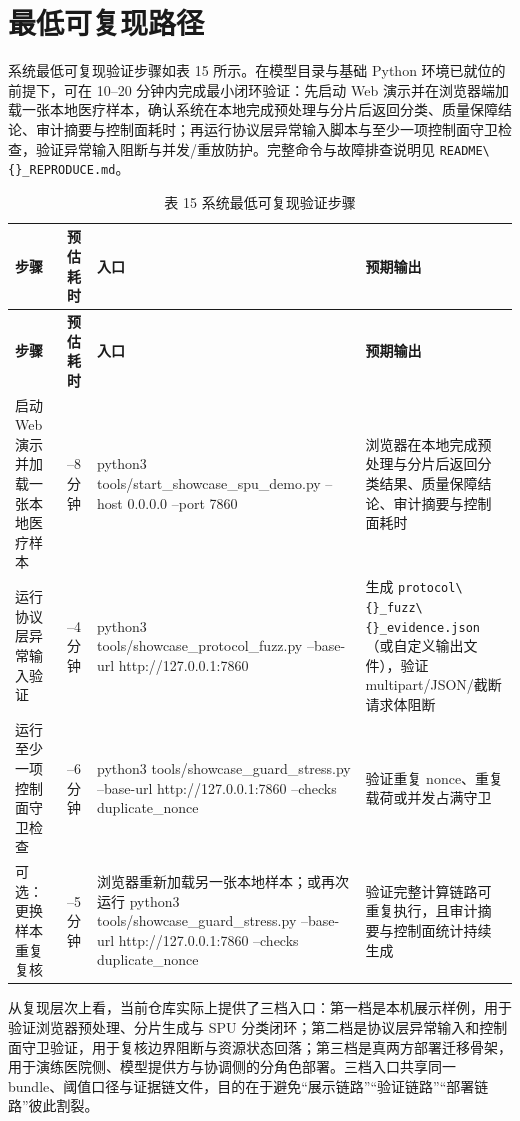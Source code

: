 \section{最低可复现路径}

系统最低可复现验证步骤如表 15 所示。在模型目录与基础 Python 环境已就位的前提下，可在 10–20 分钟内完成最小闭环验证：先启动 Web 演示并在浏览器端加载一张本地医疗样本，确认系统在本地完成预处理与分片后返回分类、质量保障结论、审计摘要与控制面耗时；再运行协议层异常输入脚本与至少一项控制面守卫检查，验证异常输入阻断与并发/重放防护。完整命令与故障排查说明见 \texttt{README\textbackslash\{\}\_REPRODUCE.md}。

\begin{longtable}{>{\raggedright\arraybackslash}p{}>{\raggedright\arraybackslash}p{}>{\raggedright\arraybackslash}p{}>{\raggedright\arraybackslash}p{}}
\caption{表 15 系统最低可复现验证步骤}\\
\toprule
\textbf{步骤} & \textbf{预估耗时} & \textbf{入口} & \textbf{预期输出} \\
\midrule
\endfirsthead
\toprule
\textbf{步骤} & \textbf{预估耗时} & \textbf{入口} & \textbf{预期输出} \\
\midrule
\endhead
启动 Web 演示并加载一张本地医疗样本 & 3–8 分钟 & python3 tools/start\_showcase\_spu\_demo.py --host 0.0.0.0 --port 7860 & 浏览器在本地完成预处理与分片后返回分类结果、质量保障结论、审计摘要与控制面耗时 \\
运行协议层异常输入验证 & 2–4 分钟 & python3 tools/showcase\_protocol\_fuzz.py --base-url http://127.0.0.1:7860 & 生成 \texttt{protocol\textbackslash\{\}\_fuzz\textbackslash\{\}\_evidence.json}（或自定义输出文件），验证 multipart/JSON/截断请求体阻断 \\
运行至少一项控制面守卫检查 & 2–6 分钟 & python3 tools/showcase\_guard\_stress.py --base-url http://127.0.0.1:7860 --checks duplicate\_nonce & 验证重复 nonce、重复载荷或并发占满守卫 \\
可选：更换样本重复复核 & 2–5 分钟 & 浏览器重新加载另一张本地样本；或再次运行 python3 tools/showcase\_guard\_stress.py --base-url http://127.0.0.1:7860 --checks duplicate\_nonce & 验证完整计算链路可重复执行，且审计摘要与控制面统计持续生成 \\
\bottomrule
\end{longtable}

从复现层次上看，当前仓库实际上提供了三档入口：第一档是本机展示样例，用于验证浏览器预处理、分片生成与 SPU 分类闭环；第二档是协议层异常输入和控制面守卫验证，用于复核边界阻断与资源状态回落；第三档是真两方部署迁移骨架，用于演练医院侧、模型提供方与协调侧的分角色部署。三档入口共享同一 bundle、阈值口径与证据链文件，目的在于避免“展示链路”“验证链路”“部署链路”彼此割裂。

